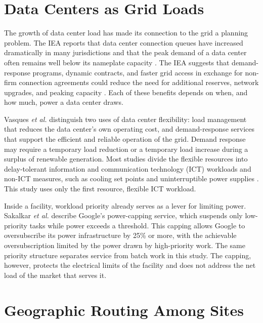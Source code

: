 \documentclass{UNCC-thesis}
\begin{document}
\section{Data Centers as Grid Loads}
\label{sec:lit-grid-loads}

The growth of data center load has made its connection to the grid a planning problem. The IEA
reports that data center connection queues have increased dramatically in many jurisdictions and
that the peak demand of a data center often remains well below its nameplate capacity
\cite{iea2026energyai}. The IEA suggests that demand-response programs, dynamic contracts, and
faster grid access in exchange for non-firm connection agreements could reduce the need for
additional reserves, network upgrades, and peaking capacity \cite{iea2026energyai}. Each of these
benefits depends on when, and how much, power a data center draws.

Vasques \emph{et al.} \cite{vasques2019review} distinguish two uses of data center flexibility:
load management that reduces the data center's own operating cost, and demand-response services
that support the efficient and reliable operation of the grid. Demand response may require a
temporary load reduction or a temporary load increase during a surplus of renewable generation.
Most studies divide the flexible resources into delay-tolerant information and communication
technology (ICT) workloads and non-ICT measures, such as cooling set points and uninterruptible
power supplies \cite{vasques2019review}. This study uses only the first resource, flexible ICT
workload.

Inside a facility, workload priority already serves as a lever for limiting power. Sakalkar
\emph{et al.} \cite{sakalkar2020oversubscription} describe Google's power-capping service, which
suspends only low-priority tasks while power exceeds a threshold. This capping allows Google to
oversubscribe its power infrastructure by 25\% or more, with the achievable oversubscription
limited by the power drawn by high-priority work. The same priority structure separates service
from batch work in this study. The capping, however, protects the electrical limits of the
facility and does not address the net load of the market that serves it.

\section{Geographic Routing Among Sites}
\label{sec:lit-routing}
\end{document}
